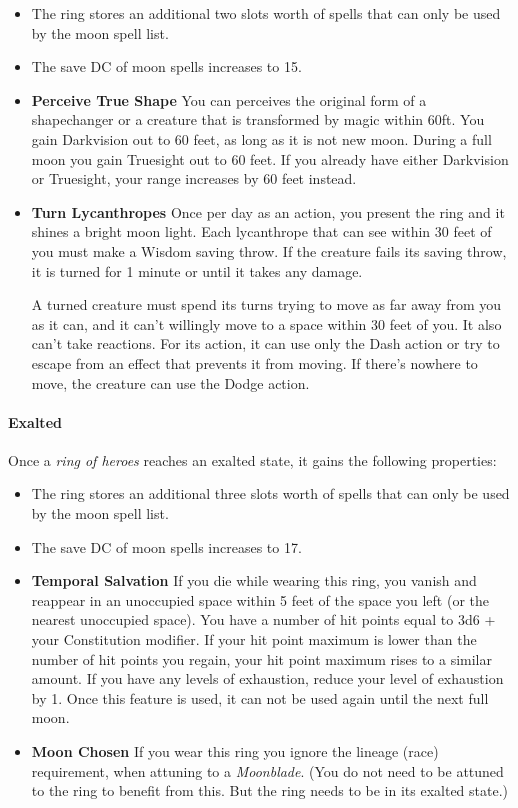 \documentclass[letter,10pt,twocolumn,openany]{dndbook}
\begin{document}
\begin{itemize}
    \item The ring stores an additional two slots worth of spells that can only be used by the moon spell list.
    \item The save DC of moon spells increases to 15.
    \item \textbf{Perceive True Shape}
    You can perceives the original form of a shapechanger or a creature that is transformed by magic within 60ft.
    You gain Darkvision out to 60 feet, as long as it is not new moon.
    During a full moon you gain Truesight out to 60 feet.
    If you already have either Darkvision or Truesight, your range increases by 60 feet instead.
    \item \textbf{Turn Lycanthropes}
    Once per day as an action, you present the ring and it shines a bright moon light.
    Each lycanthrope that can see within 30 feet of you must make a Wisdom saving throw.
    If the creature fails its saving throw, it is turned for 1 minute or until it takes any damage.

    A turned creature must spend its turns trying to move as far away from you as it can, and it can't willingly move to a space within 30 feet of you. It also can't take reactions. For its action, it can use only the Dash action or try to escape from an effect that prevents it from moving. If there's nowhere to move, the creature can use the Dodge action.
\end{itemize}


\paragraph{Exalted}
Once a \textit{ring of heroes} reaches an exalted state, it gains the following properties:

\begin{itemize}
    \item The ring stores an additional three slots worth of spells that can only be used by the moon spell list.
    \item The save DC of moon spells increases to 17.
    \item \textbf{Temporal Salvation}
    If you die while wearing this ring, you vanish and reappear in an unoccupied space within 5 feet of the space you left (or the nearest unoccupied space).
    You have a number of hit points equal to 3d6 + your Constitution modifier.
    If your hit point maximum is lower than the number of hit points you regain, your hit point maximum rises to a similar amount.
    If you have any levels of exhaustion, reduce your level of exhaustion by 1.
    Once this feature is used, it can not be used again until the next full moon.
    \item \textbf{Moon Chosen}
    If you wear this ring you ignore the lineage (race) requirement, when attuning to a \textit{Moonblade}.
    (You do not need to be attuned to the ring to benefit from this.
    But the ring needs to be in its exalted state.)
\end{itemize}
\end{document}

